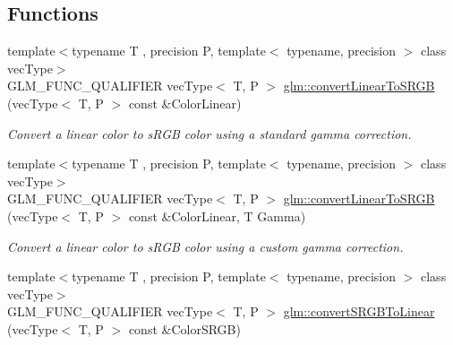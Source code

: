 \subsection*{Functions}
\begin{DoxyCompactItemize}
\item 
\hypertarget{group__gtc__color__space_gad813dcd99644cafc775e83d6504ccb93}{{\footnotesize template$<$typename T , precision P, template$<$ typename, precision $>$ class vec\-Type$>$ }\\G\-L\-M\-\_\-\-F\-U\-N\-C\-\_\-\-Q\-U\-A\-L\-I\-F\-I\-E\-R vec\-Type$<$ T, P $>$ \hyperlink{group__gtc__color__space_gad813dcd99644cafc775e83d6504ccb93}{glm\-::convert\-Linear\-To\-S\-R\-G\-B} (vec\-Type$<$ T, P $>$ const \&Color\-Linear)}\label{group__gtc__color__space_gad813dcd99644cafc775e83d6504ccb93}

\begin{DoxyCompactList}\small\item\em Convert a linear color to s\-R\-G\-B color using a standard gamma correction. \end{DoxyCompactList}\item 
\hypertarget{group__gtc__color__space_ga63f8b003da7acf44370eb47bfb8b3d42}{{\footnotesize template$<$typename T , precision P, template$<$ typename, precision $>$ class vec\-Type$>$ }\\G\-L\-M\-\_\-\-F\-U\-N\-C\-\_\-\-Q\-U\-A\-L\-I\-F\-I\-E\-R vec\-Type$<$ T, P $>$ \hyperlink{group__gtc__color__space_ga63f8b003da7acf44370eb47bfb8b3d42}{glm\-::convert\-Linear\-To\-S\-R\-G\-B} (vec\-Type$<$ T, P $>$ const \&Color\-Linear, T Gamma)}\label{group__gtc__color__space_ga63f8b003da7acf44370eb47bfb8b3d42}

\begin{DoxyCompactList}\small\item\em Convert a linear color to s\-R\-G\-B color using a custom gamma correction. \end{DoxyCompactList}\item 
\hypertarget{group__gtc__color__space_ga28e98e64347cf385cadc1ceb4def55c9}{{\footnotesize template$<$typename T , precision P, template$<$ typename, precision $>$ class vec\-Type$>$ }\\G\-L\-M\-\_\-\-F\-U\-N\-C\-\_\-\-Q\-U\-A\-L\-I\-F\-I\-E\-R vec\-Type$<$ T, P $>$ \hyperlink{group__gtc__color__space_ga28e98e64347cf385cadc1ceb4def55c9}{glm\-::convert\-S\-R\-G\-B\-To\-Linear} (vec\-Type$<$ T, P $>$ const \&Color\-S\-R\-G\-B)}\label{group__gtc__color__space_ga28e98e64347cf385cadc1ceb4def55c9}


\end{DoxyCompactItemize}
